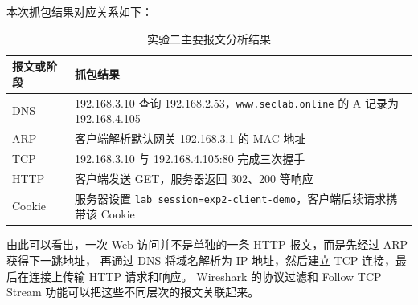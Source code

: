 本次抓包结果对应关系如下：

\begin{table}[H]
    \centering
    \caption{实验二主要报文分析结果}
    \label{tab:jly-task2-result}
    \small
    \renewcommand{\arraystretch}{1.35}
    \begin{tabularx}{\linewidth}{>{\raggedright\arraybackslash}p{2.6cm}X}
        \toprule
        报文或阶段 & 抓包结果 \\
        \midrule
        DNS & 192.168.3.10 查询 192.168.2.53，\texttt{www.seclab.online} 的 A 记录为 192.168.4.105 \\
        ARP & 客户端解析默认网关 192.168.3.1 的 MAC 地址 \\
        TCP & 192.168.3.10 与 192.168.4.105:80 完成三次握手 \\
        HTTP & 客户端发送 GET，服务器返回 302、200 等响应 \\
        Cookie & 服务器设置 \texttt{lab\_session=exp2-client-demo}，客户端后续请求携带该 Cookie \\
        \bottomrule
    \end{tabularx}
\end{table}

由此可以看出，一次 Web 访问并不是单独的一条 HTTP 报文，而是先经过 ARP 获得下一跳地址，
再通过 DNS 将域名解析为 IP 地址，然后建立 TCP 连接，最后在连接上传输 HTTP 请求和响应。
Wireshark 的协议过滤和 Follow TCP Stream 功能可以把这些不同层次的报文关联起来。
